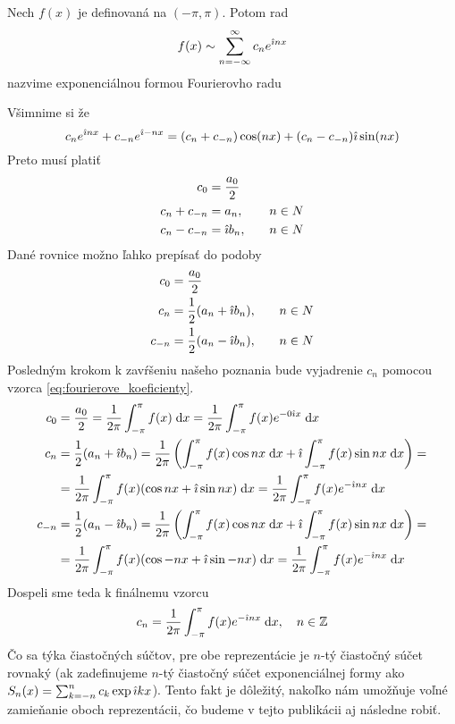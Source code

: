 \begin{definicia}
    Nech $f(x)$ je definovaná na $(-\pi,\pi)$. Potom rad
    \begin{equation}
        f(x) \sim \sum_{n=-\infty}^{\infty} c_n e^{\hat{\imath} n x}
    \end{equation}
    nazvime exponenciálnou formou Fourierovho radu
\end{definicia}
Všimnime si že
\begin{equation}
    c_n e^{\hat{\imath} n x} + c_{-n} e^{\hat{\imath} -n x} =
     (c_n +c_{-n}) \cos(nx) + (c_n - c_{-n}) \hat{\imath} \sin(nx)
\end{equation}
Preto musí platiť
\begin{align}
    c_0 &= \frac{a_0}{2} \\
    c_n + c_{-n} &= a_n, \quad & n \in N \\
    c_n - c_{-n} &= \hat{\imath} b_n, \quad & n \in N
\end{align}
Dané rovnice možno ľahko prepísať do podoby
\begin{align}
    c_0 &= \frac{a_0}{2} \\
    c_n &= \frac{1}{2}(a_n + \hat{\imath} b_n), \quad & n \in N \\
    c_{-n} &=\frac{1}{2}(a_n - \hat{\imath} b_n), \quad & n \in N
\end{align}
Posledným krokom k zavŕšeniu našeho poznania bude vyjadrenie $c_n$
pomocou vzorca \ref{eq:fourierove_koeficienty}.
\begin{align}
    c_0 &= \frac{a_0}{2} = \frac{1}{2\pi} \int_{-\pi}^{\pi} f(x) \; \mathrm{d} x = 
            \frac{1}{2\pi} \int_{-\pi}^{\pi} f(x) e^{-0 \hat{\imath} x} \; \mathrm{d} x \\
    c_n &= \frac{1}{2}(a_n + \hat{\imath} b_n) =
          \frac{1}{2\pi}\left(
            \int_{-\pi}^{\pi} f(x) \cos nx \; \mathrm{d} x + 
            \hat{\imath} \int_{-\pi}^{\pi} f(x) \sin nx \; \mathrm{d} x  
            \right) = \\
         &=\frac{1}{2\pi} \int_{-\pi}^{\pi} f(x) (\cos nx + \hat{\imath} \sin nx) \; \mathrm{d} x =
          \frac{1}{2\pi} \int_{-\pi}^{\pi} f(x) e^{- \hat{\imath} n x} \; \mathrm{d} x \\
    c_{-n} &= \frac{1}{2}(a_n - \hat{\imath} b_n) =
          \frac{1}{2\pi}\left(
            \int_{-\pi}^{\pi} f(x) \cos nx \; \mathrm{d} x + 
            \hat{\imath} \int_{-\pi}^{\pi} f(x) \sin nx \; \mathrm{d} x  
            \right) = \\
         &=\frac{1}{2\pi} \int_{-\pi}^{\pi} f(x) (\cos -nx + \hat{\imath} \sin -nx) \; \mathrm{d} x =
          \frac{1}{2\pi} \int_{-\pi}^{\pi} f(x) e^{- \hat{\imath} n x} \; \mathrm{d} x        
\end{align}
Dospeli sme teda k finálnemu vzorcu
\begin{equation}
    c_n = \frac{1}{2\pi} \int_{-\pi}^{\pi} f(x) e^{-\hat{\imath} n x} \; \mathrm{d} x, 
        \quad n\in \mathbb{Z}
\end{equation}
Čo sa týka čiastočných súčtov, pre obe reprezentácie je $n$-tý
čiastočný súčet rovnaký (ak zadefinujeme $n$-tý čiastočný súčet
exponenciálnej formy ako $S_n(x) = \sum_{k=-n}^{n} c_k \exp{\hat{\imath}k
x}$). Tento fakt je dôležitý, nakoľko nám umožňuje voľné zamieňanie
oboch reprezentácii, čo budeme v tejto publikácii aj následne robiť.

